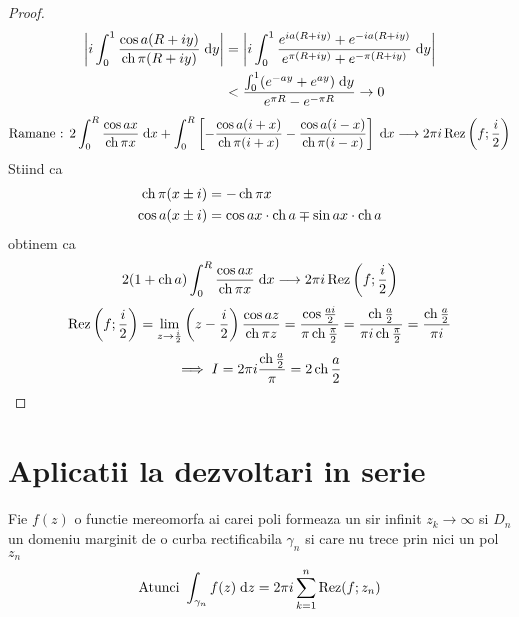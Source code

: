 \begin{aplicatie}
\begin{proof}
            \begin{align*}
              \left| i \int_{0}^{1} \frac{\cos a (R+iy)}{\operatorname{ch} \pi (R+iy)} \; \mathrm{d} y \right|
                 &= \left| i \int_{0}^{1} \frac{e^{ia(R+iy)} + e^{-ia(R+iy)}}
                                           {e^{\pi(R+iy)} + e^{-\pi(R+iy)}} \; \mathrm{d} y \right|
              \\ &< \frac{\int_{0}^{1} (e^{-ay} + e^{ay}) \; \mathrm{d} y}{e^{\pi R} - e^{-\pi R}}
                \to 0
            \end{align*}
            \[
                \text{Ramane : } 2 \int_{0}^{R} \frac{\cos ax}{\operatorname{ch} \pi x} \; \mathrm{d} x
                    + \int_{0}^{R} \left[
                                    - \frac{\cos a(i+x)}{\operatorname{ch} \pi (i+x)}
                                    - \frac{\cos a(i-x)}{\operatorname{ch} \pi (i-x)}
                                   \right] \; \mathrm{d} x
                \longrightarrow 2 \pi i \operatorname{Rez} \left(f;\frac{i}{2}\right)
            \]
            Stiind ca
            \begin{align*}
                \operatorname{ch} \pi( x \pm i) &= -\operatorname{ch} \pi x
                \\
                \cos a(x \pm i) &= \cos ax \cdot \operatorname{ch} a \mp \sin ax \cdot \operatorname{ch} a
            \end{align*}
            obtinem ca
            \[
                2(1+\operatorname{ch} a) \int_{0}^{R} \frac{\cos ax}{\operatorname{ch} \pi x} \; \mathrm{d} x
                    \longrightarrow 2 \pi i \operatorname{Rez} \left(f;\frac{i}{2}\right)
            \]
            \[
                \operatorname{Rez} \left(f;\frac{i}{2} \right)
                    = \lim_{z\to\frac{i}{2}} \left( z- \frac{i}{2}\right) \frac{\cos az}{\operatorname{ch} \pi z}
                    = \frac{\cos \frac{ai}{2}}{\pi \operatorname{ch} \frac{\pi}{2}}
                    = \frac{\operatorname{ch} \frac{a}{2}}{\pi i \operatorname{ch} \frac{\pi}{2}}
                    = \frac{\operatorname{ch} \frac{a}{2}}{\pi i}
            \]
            \[
                \implies I = 2 \pi i \frac{\operatorname{ch} \frac{a}{2}}{\pi} = 2 \operatorname{ch} \frac{a}{2}
            \]
        \end{proof}

    \end{aplicatie}

    \section{Aplicatii la dezvoltari in serie}

    \begin{theorem}
        Fie $f(z)$ o functie mereomorfa ai carei poli formeaza un sir infinit $z_k \to \infty$
        si $D_n$ un domeniu marginit de o curba rectificabila $\gamma_n$ si care nu trece
        prin nici un pol $z_n$
        \[
            \text{Atunci } \int_{\gamma_n} f(z) \; \mathrm{d} z = 2\pi i \sum_{k=1}^{n} \operatorname{Rez} (f;z_n)
        \]
    \end{theorem}

